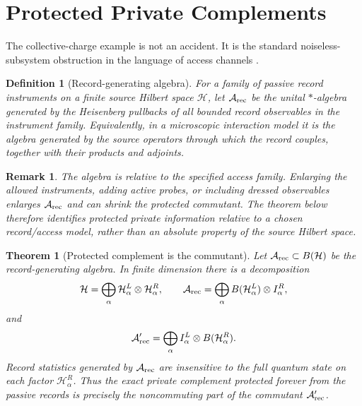 \documentclass[11pt]{article}
\newtheorem{theorem}{Theorem}
\newtheorem{definition}{Definition}
\newtheorem{remark}{Remark}
\newcommand{\cH}{\mathcal H}
\newcommand{\cA}{\mathcal A}
\begin{document}
\section{Protected Private Complements}

The collective-charge example is not an accident.  It is the standard
noiseless-subsystem obstruction in the language of access channels
\citep{Zanardi1997Noiseless,Knill2000GeneralNoise,Kribs2005Unified}.

\begin{definition}[Record-generating algebra]
For a family of passive record instruments on a finite source Hilbert
space $\cH$, let $\cA_{\rm rec}$ be the unital $*$-algebra generated by
the Heisenberg pullbacks of all bounded record observables in the
instrument family.  Equivalently, in a microscopic interaction model it
is the algebra generated by the source operators through which the
record couples, together with their products and adjoints.
\end{definition}

\begin{remark}
The algebra is relative to the specified access family.  Enlarging the
allowed instruments, adding active probes, or including dressed
observables enlarges $\cA_{\rm rec}$ and can shrink the protected
commutant.  The theorem below therefore identifies protected private
information relative to a chosen record/access model, rather than an
absolute property of the source Hilbert space.
\end{remark}

\begin{theorem}[Protected complement is the commutant]
\label{thm:commutant}
Let $\cA_{\rm rec}\subset B(\cH)$ be the record-generating algebra.  In
finite dimension there is a decomposition
\begin{equation}
  \cH
  =
  \bigoplus_\alpha
  \cH_{\alpha}^{L}\otimes \cH_{\alpha}^{R},
  \qquad
  \cA_{\rm rec}
  =
  \bigoplus_\alpha
  B(\cH_{\alpha}^{L})\otimes I_{\alpha}^{R},
\end{equation}
and
\begin{equation}
  \cA_{\rm rec}'
  =
  \bigoplus_\alpha
  I_{\alpha}^{L}\otimes B(\cH_{\alpha}^{R}) .
\end{equation}
Record statistics generated by $\cA_{\rm rec}$ are insensitive to the
full quantum state on each factor $\cH_{\alpha}^{R}$.  Thus the exact
private complement protected forever from the passive records is
precisely the noncommuting part of the commutant $\cA_{\rm rec}'$.
\end{theorem}
\end{document}
